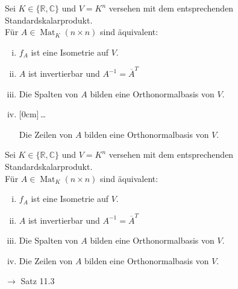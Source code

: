 \documentclass[11pt]{article}
\renewcommand{\cite}[1]{\par\bigskip\hfill{\color{gray}\tiny\(\to\) #1}}
\newcommand{\CC}{\mathbb{C}}
\newcommand{\RR}{\mathbb{R}}
\DeclareMathOperator{\Mat}{Mat}
\newcommand{\hide}[1]{\parbox{0cm}{\raisebox{-7pt}[0cm]{\dots}}\color{white}#1\color{black}}
\let\olddots\dots
\renewcommand{\dots}{\,\olddots\,}
\newenvironment{field}{}{\newpage}
\newif\ifnote
\newenvironment{note}{\notetrue}{\notefalse}
\begin{document}
\begin{note}
    \begin{field}%
        Sei \(K\in\{\RR,\CC\}\) und \(V=K^n\) versehen mit dem entsprechenden Standardskalarprodukt.\\
        Für \(A\in \Mat_K(n\times n)\) sind äquivalent:
        \begin{enumerate}[(i)]
            \item \(f_A\) ist eine Isometrie auf \(V\).
            \item \(A\) ist invertierbar und \(A^{-1}=\overline{A}^T\)
            \item Die Spalten von \(A\) bilden eine Orthonormalbasis von \(V\).
            \item \hide{Die Zeilen von \(A\) bilden eine Orthonormalbasis von \(V\).}
        \end{enumerate}
    \end{field}
    \begin{field}
        Sei \(K\in\{\RR,\CC\}\) und \(V=K^n\) versehen mit dem entsprechenden Standardskalarprodukt.\\
        Für \(A\in \Mat_K(n\times n)\) sind äquivalent:
        \begin{enumerate}[(i)]
            \item \(f_A\) ist eine Isometrie auf \(V\).
            \item \(A\) ist invertierbar und \(A^{-1}=\overline{A}^T\)
            \item Die Spalten von \(A\) bilden eine Orthonormalbasis von \(V\).
            \item Die Zeilen von \(A\) bilden eine Orthonormalbasis von \(V\).
        \end{enumerate}
        \cite{Satz 11.3}
    \end{field}
\end{note}
\end{document}
